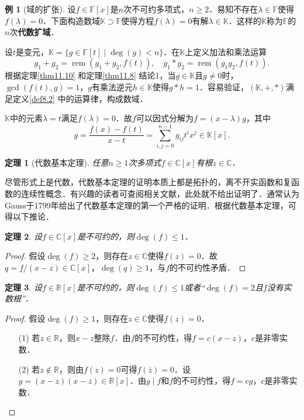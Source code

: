 \documentclass[a4paper,fontset=windows]{ctexbook}
\newtheorem{theorem}{定理}[chapter]
\theoremstyle{definition}
\newtheorem{example}{例}[chapter]
\DeclareMathOperator{\rem}{rem}
\renewcommand{\le}{\leqslant}
\renewcommand{\ge}{\geqslant}
\begin{document}
\begin{example}[域的扩张]
设$f\in\mathbb{F}[x]$是$n$次不可约多项式，$n\ge 2$．易知不存在$\lambda\in\mathbb{F}$使得$f(\lambda)=0$．下面构造数域$\mathbb{K\supset F}$使得方程$f(\lambda)=0$有解$\lambda\in\mathbb{K}$．这样的$\mathbb{K}$称为$\mathbb{F}$的$n$次{\bf 代数扩域}．

设$t$是变元，$\mathbb{K}=\{g\in\mathbb{F}[t]\mid\deg(g)<n\}$．在$\mathbb{K}$上定义加法和乘法运算
$$g_1+g_2=\rem(g_1+g_2,f(t)),\quad g_1*g_2=\rem(g_1g_2,f(t)).$$
根据定理\ref{thm11.10} 和定理\ref{thm11.8} 结论1，当$g\in\mathbb{K}$且$g\ne 0$时，$\gcd(f(t),g)=1$，$g$有乘法逆元$h\in\mathbb{K}$使得$g*h=1$．容易验证，$(\mathbb{K},+,*)$满足定义\ref{def8.2} 中的运算律，构成数域．

$\mathbb{K}$中的元素$\lambda=t$满足$f(\lambda)=0$．故$f$可以因式分解为$f=(x-\lambda)g$，其中
$$g=\frac{f(x)-f(t)}{x-t}=\sum\limits_{i,j=0}^{n-1}g_{ij}t^ix^j\in\mathbb{K}[x].$$
\end{example}

\begin{theorem}[代数基本定理]
任意$n\ge 1$次多项式$f\in\mathbb{C}[x]$有根$z\in\mathbb{C}$．
\end{theorem}

尽管形式上是代数，代数基本定理的证明本质上都是拓扑的，离不开实函数和复函数的连续性概念．有兴趣的读者可查阅相关文献，此处就不给出证明了．通常认为Gauss于1799年给出了代数基本定理的第一个严格的证明．根据代数基本定理，可得以下推论．

\begin{theorem}
设$f\in\mathbb{C}[x]$是不可约的，则$\deg(f)\le 1$．
\end{theorem}

\begin{proof}
假设$\deg(f)\ge 2$，则存在$z\in\mathbb{C}$使得$f(z)=0$．故$q=f/(x-z)\in\mathbb{C}[x]$，$\deg(q)\ge 1$，与$f$的不可约性矛盾．
\end{proof}

\begin{theorem}
设$f\in\mathbb{R}[x]$是不可约的，则$\deg(f)\le 1$或者“$\deg(f)=2$且$f$没有实数根”．
\end{theorem}

\begin{proof}
假设$\deg(f)\ge 1$，则存在$z\in\mathbb{C}$使得$f(z)=0$．
\begin{itemize}
\item[(1)] 若$z\in\mathbb{R}$，则$x-z$整除$f$．由$f$的不可约性，得$f=c(x-z)$，$c$是非零实数．
\item[(2)] 若$z\notin\mathbb{R}$，则由$f(z)=0$可得$f(\overline{z})=0$．设$g=(x-z)(x-\overline{z})\in\mathbb{R}[x]$．由$g\mid f$和$f$的不可约性，得$f=cg$，$c$是非零实数．\qedhere
\end{itemize}
\end{proof}
\end{document}
